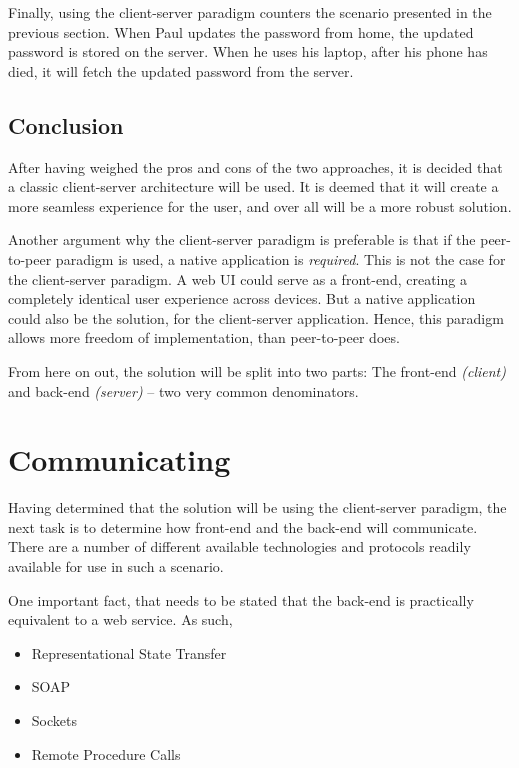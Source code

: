 			Finally, using the client-server paradigm counters the scenario presented in the previous section. When Paul updates the password from home, the updated password is stored on the server. When he uses his laptop, after his phone has died, it will fetch the updated password from the server.


		\subsection{Conclusion}
			After having weighed the pros and cons of the two approaches, it is decided that a classic client-server architecture will be used. It is deemed that it will create a more seamless experience for the user, and over all will be a more robust solution.

			Another argument why the client-server paradigm is preferable is that if the peer-to-peer paradigm is used, a native application is \emph{required}. This is not the case for the client-server paradigm. A web UI could serve as a front-end, creating a completely identical user experience across devices. But a native application could also be the solution, for the client-server application. Hence, this paradigm allows more freedom of implementation, than peer-to-peer does.

			From here on out, the solution will be split into two parts: The front-end \emph{(client)} and back-end \emph{(server)} -- two very common denominators.

	\section{Communicating}
		\label{sec:comms}
		Having determined that the solution will be using the client-server paradigm, the next task is to determine how front-end and the back-end will communicate. There are a number of different available technologies and protocols readily available for use in such a scenario.

		One important fact, that needs to be stated that the back-end is practically equivalent to a web service. As such, 

		\begin{itemize}
			\item Representational State Transfer
			\item SOAP	
			\item Sockets
			\item Remote Procedure Calls
		\end{itemize}

